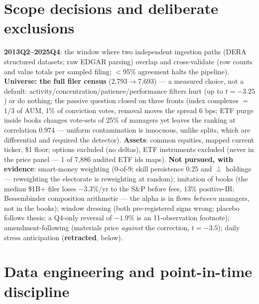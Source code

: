 \documentclass[10pt]{article}
\begin{document}
\section{Scope decisions and deliberate exclusions}

\textbf{2013Q2--2025Q4}: the window where two independent ingestion
paths (DERA structured datasets; raw EDGAR parsing) overlap and
cross-validate (row counts and value totals per sampled filing;
$<$95\% agreement halts the pipeline). \textbf{Universe: the full
filer census} (2{,}793$\to$7{,}693) --- a measured choice, not a
default: activity/concentration/patience/performance filters hurt
(up to $t=-3.25$) or do nothing; the passive question closed on
three fronts (index complexes $=$ 1/3 of AUM, 1\% of conviction
votes, removal moves the spread 6 bps; ETF purge inside books
changes vote-sets of 25\% of managers yet leaves the ranking at
correlation 0.974 --- uniform contamination is innocuous, unlike
splits, which are differential and required the detector).
\textbf{Assets}: common equities, mapped current ticker, \$1 floor;
options excluded (no deltas), ETF instruments excluded (never in the
price panel --- 1 of 7{,}886 audited ETF ids maps). \textbf{Not
pursued, with evidence}: smart-money weighting (0-of-9; skill
persistence 0.25 and $\perp$ holdings --- reweighting the electorate
is reweighting at random); imitation of books (the median \$1B+
filer loses $-3.3\%$/yr to the S\&P before fees, 13\% positive-IR:
Bessembinder composition arithmetic --- the alpha is in flows
\emph{between} managers, not in the books); window dressing (both
pre-registered signs wrong; placebo follows thesis; a Q4-only
reversal of $-1.9\%$ is an 11-observation footnote);
amendment-following (materials price \emph{against} the correction,
$t=-3.5$); daily stress anticipation (\textbf{retracted}, below).

\section{Data engineering and point-in-time discipline}
\end{document}
